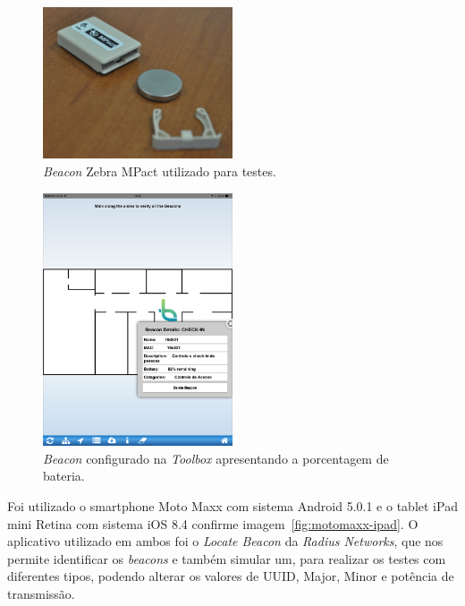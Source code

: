 \documentclass[
		12pt,				%
		openright,			%
		oneside,			%
		a4paper,			%
		chapter=TITLE,		%
		english,			%
		brazil				%
	]{abntex2}
\begin{document}
\begin{figure}[htb]
	\caption{\label{fig:zebra-mpact}\textit{Beacon} Zebra MPact utilizado para testes.}
	\begin{center}
		\includegraphics[width=0.5\textwidth]{img/beacon-mpact2.jpg}
	\end{center}
\end{figure}

\begin{figure}[htb]
	\caption{\label{fig:exemplo-toolbox}\textit{Beacon} configurado na \textit{Toolbox} apresentando a porcentagem de bateria.}
	\begin{center}
		\includegraphics[width=0.5\textwidth]{img/toolbox-exemplo.png}
	\end{center}
\end{figure}

Foi utilizado o smartphone Moto Maxx com sistema Android 5.0.1 e o tablet iPad mini Retina com sistema iOS 8.4 confirme imagem~\ref{fig:motomaxx-ipad}. O aplicativo utilizado em ambos foi o \textit{Locate Beacon} da \textit{Radius Networks}, que nos permite identificar os \textit{beacons} e também simular um, para realizar os testes com diferentes tipos, podendo alterar os valores de UUID, Major, Minor e potência de transmissão.
\end{document}
